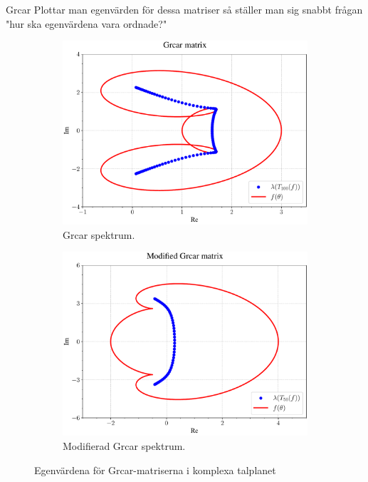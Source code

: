 \documentclass{beamer}
\begin{document}
\begin{frame}{Grcar}
    Plottar man egenvärden för dessa matriser så ställer man sig snabbt frågan "hur ska egenvärdena vara ordnade?"
    \begin{figure}[H]
    \centering
    \begin{subfigure}{0.49\textwidth}
        \includegraphics[width=\textwidth]{images/Grcar_comp.pdf}
        \caption{Grcar spektrum.}
        \label{fig:Grcar spectrum1}
    \end{subfigure}
    \hfill
    \begin{subfigure}{0.49\textwidth}
        \includegraphics[width=\textwidth]{images/modifiedgrcar1comp.pdf}
        \caption{Modifierad Grcar spektrum.}
        \label{fig:Grcar spectrum2}
    \end{subfigure}
    \caption{Egenvärdena för Grcar-matriserna i komplexa talplanet}
    \label{fig:Grcar spektrum}
    \end{figure}
\end{frame}
\end{document}
